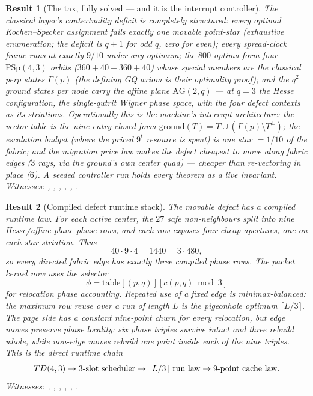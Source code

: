 \documentclass[11pt]{article}
\newtheorem{result}{Result}
\begin{document}
\begin{result}[The tax, fully solved --- and it is the interrupt controller]
The classical layer's contextuality deficit is completely structured: every optimal Kochen--Specker
assignment fails exactly one \emph{movable point-star} (exhaustive enumeration; the deficit is $q+1$
for odd $q$, zero for even); every spread-clock frame runs at exactly $9/10$ under any optimum; the
$800$ optima form four $\mathrm{PSp}(4,3)$ orbits ($360+40+360+40$) whose special members are the
classical \emph{perp states} $\Gamma(p)$ (the defining GQ axiom is their optimality proof); and the
$q^2$ ground states per node carry the affine plane $\mathrm{AG}(2,q)$ --- at $q=3$ the Hesse
configuration, the single-qutrit Wigner phase space, with the four defect contexts as its striations.
Operationally this \emph{is} the machine's interrupt architecture: the vector table is the nine-entry
closed form $\mathrm{ground}(T)=T\cup(\Gamma(p)\setminus T^\perp)$; the escalation budget (where the
priced $9^t$ resource is spent) is one star $=1/10$ of the fabric; and the migration price law makes
the defect cheapest to move along fabric edges ($3$ rays, via the ground's own center quad) --- cheaper
than re-vectoring in place ($6$).  A seeded controller run holds every theorem as a live invariant.
Witnesses: , , ,
, , .
\end{result}

\begin{result}[Compiled defect runtime stack]
The movable defect has a compiled runtime law.  For each active center, the $27$ safe non-neighbours
split into nine Hesse/affine-plane phase rows, and each row exposes four cheap apertures, one on each
star striation.  Thus
\[
40\cdot9\cdot4=1440=3\cdot480,
\]
so every directed fabric edge has exactly three compiled phase rows.  The packet kernel now uses the
selector
\[
\phi=\mathrm{table}[(p,q)][c(p,q)\bmod 3]
\]
for relocation phase accounting.  Repeated use of a fixed edge is minimax-balanced: the maximum row reuse
over a run of length $L$ is the pigeonhole optimum $\lceil L/3\rceil$.  The page side has a constant
nine-point churn for every relocation, but edge moves preserve phase locality: six phase triples survive
intact and three rebuild whole, while non-edge moves rebuild one point inside each of the nine triples.
This is the direct runtime chain
\[
TD(4,3)\to 3\hbox{-slot scheduler}\to \lceil L/3\rceil\hbox{ run law}\to 9\hbox{-point cache law}.
\]
Witnesses: , ,
, ,
, .
\end{result}
\end{document}
